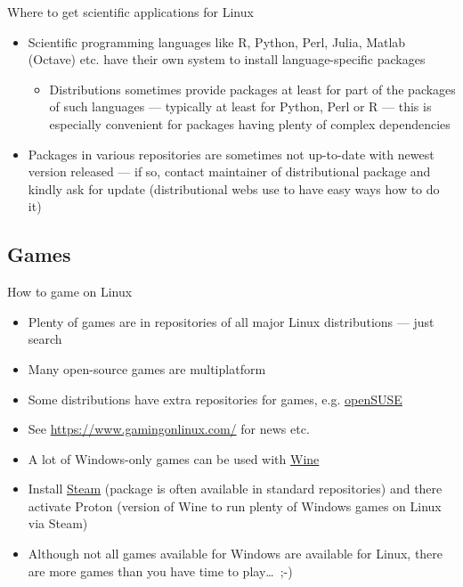 \documentclass[compress, xelatex, 11pt, xcolor=svgnames, aspectratio=169, url={hyphens, lowtilde}]{beamer}
\begin{document}
\begin{frame}[allowframebreaks]{Where to get scientific applications for Linux}
\begin{itemize}
\begin{itemize}
		\end{itemize}
		\item Scientific programming languages like R, Python, Perl, Julia, Matlab (Octave) etc. have their own system to install language-specific packages
		\begin{itemize}
			\item Distributions sometimes provide packages at least for part of the packages of such languages --- typically at least for Python, Perl or R --- this is especially convenient for packages having plenty of complex dependencies
		\end{itemize}
		\item Packages in various repositories are sometimes not up-to-date with newest version released --- if so, contact maintainer of distributional package and kindly ask for update (distributional webs use to have easy ways how to do it)
	\end{itemize}
\end{frame}

\subsection{Games}

\begin{frame}{How to game on Linux}
	\begin{itemize}
		\item Plenty of games are in repositories of all major Linux distributions --- just search
		\item Many open-source games are multiplatform
		\item Some distributions have extra repositories for games, e.g. \href{https://software.opensuse.org/packages/Games}{openSUSE}
		\item See \url{https://www.gamingonlinux.com/} for news etc.
		\item A lot of Windows-only games can be used with \href{https://appdb.winehq.org/}{Wine}
		\item Install \href{https://store.steampowered.com/}{Steam} (package is often available in standard repositories) and there activate Proton (version of Wine to run plenty of Windows games on Linux via Steam)
		\item Although not all games available for Windows are available for Linux, there are more games than you have time to play\ldots~;-)
	\end{itemize}
\end{frame}
\end{document}
